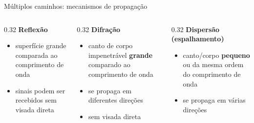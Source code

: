 \documentclass[aspectratio=169,11pt]{beamer}
\begin{document}
\begin{frame}{Múltiplos caminhos: mecanismos de propagação}
  \begin{columns}
    \begin{column}{0.32\textwidth}
      \textbf{Reflexão}
      \begin{itemize}
        \item superfície grande comparada ao comprimento de onda
        \item sinais podem ser recebidos sem visada direta
      \end{itemize}
    \end{column}
    \begin{column}{0.32\textwidth}
      \textbf{Difração}
      \begin{itemize}
        \item canto de corpo impenetrável \textbf{grande} comparado ao comprimento de onda
        \item se propaga em diferentes direções
        \item sem visada direta
      \end{itemize}
    \end{column}
    \begin{column}{0.32\textwidth}
      \textbf{Dispersão (espalhamento)}
      \begin{itemize}
        \item canto/corpo \textbf{pequeno} ou da mesma ordem do comprimento de onda
        \item se propaga em várias direções
      \end{itemize}
    \end{column}
  \end{columns}
  \vspace{0.3cm}
  \begin{center}
  \end{center}
\end{frame}
\end{document}
